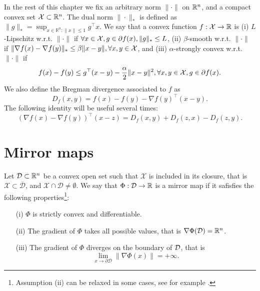 In the rest of this chapter we fix an arbitrary norm $\|\cdot\|$ on $\mathbb{R}^n$, and a compact convex set $\mathcal{X} \subset \mathbb{R}^n$. The dual norm $\|\cdot\|_*$ is defined as $\|g\|_* = \sup_{x \in \mathbb{R}^n : \|x\| \leq 1} g^{\top} x$. We say that a convex function $f : \mathcal{X} \rightarrow \mathbb{R}$ is (i) $L$-Lipschitz w.r.t. $\|\cdot\|$ if $\forall x \in \mathcal{X}, g \in \partial f(x), \|g\|_* \leq L$, (ii) $\beta$-smooth w.r.t. $\|\cdot\|$ if $\|\nabla f(x) - \nabla f(y) \|_* \leq \beta \|x-y\|, \forall x, y \in \mathcal{X}$, and (iii) $\alpha$-strongly convex w.r.t. $\|\cdot\|$ if 
$$f(x) - f(y) \leq g^{\top} (x - y) - \frac{\alpha}{2} \|x - y \|^2 , \forall x, y \in \mathcal{X}, g \in \partial f(x).$$ We also define the Bregman divergence associated to $f$ as 
$$D_{f}(x,y) = f(x) - f(y) - \nabla f(y)^{\top} (x - y) .$$
The following identity will be useful several times:
\begin{equation} \label{eq:useful1}
(\nabla f(x) - \nabla f(y))^{\top}(x-z) = D_{f}(x,y) + D_{f}(z,x) - D_{f}(z,y) .
\end{equation}

\section{Mirror maps} \label{sec:mm}
Let $\mathcal{D} \subset \mathbb{R}^n$ be a convex open set such that $\mathcal{X}$ is included in its closure, that is $\mathcal{X} \subset \overline{\mathcal{D}}$, and $\mathcal{X} \cap \mathcal{D} \neq \emptyset$. We say that $\Phi : \mathcal{D} \rightarrow \mathbb{R}$ is a mirror map if it safisfies the following properties\footnote{Assumption (ii) can be relaxed in some cases, see for example \cite{ABL14}.}:
\begin{enumerate}
\item[(i)] $\Phi$ is strictly convex and differentiable.
\item[(ii)] The gradient of $\Phi$ takes all possible values, that is $\nabla \Phi(\mathcal{D}) = \mathbb{R}^n$.
\item[(iii)] The gradient of $\Phi$ diverges on the boundary of $\mathcal{D}$, that is 
$$\lim_{x \rightarrow \partial \mathcal{D}} \|\nabla \Phi(x)\| = + \infty .$$
\end{enumerate}

